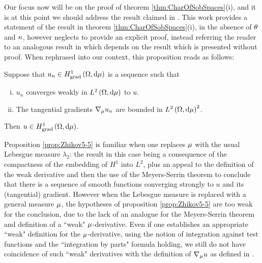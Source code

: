 Our focus now will be on the proof of theorem \ref{thm:CharOfSobSpaces}(i), and it is at this point we should address the result claimed in \cite{zhikov2002homogenization}.
This work provides a statement of the result in theorem \ref{thm:CharOfSobSpaces}(i), in the absence of $\theta$ and $\kappa$, however neglects to provide an explicit proof, instead referring the reader to an analogous result in \cite[lemma 6.1]{zhikov2002homogenization} which depends on the result \cite[proposition 5.5]{zhikov2002homogenization} which is presented without proof.
When rephrased into our context, this proposition reads as follows:
\begin{prop} \label{prop:Zhikov5-5}
	Suppose that $u_n\in H^1_\mathrm{grad}\left( \Omega, \mathrm{d}\mu \right)$ is a sequence such that
	\begin{enumerate}[(i)]
		\item $u_n$ converges weakly in $L^{2}\left( \Omega,\mathrm{d} \mu \right)$ to $u$.
		\item The tangential gradients $\nabla_{\mu}u_n$ are bounded in $L^{2}\left( \Omega,\mathrm{d} \mu \right)^2$.
	\end{enumerate}
	Then $u\in H^1_\mathrm{grad}\left( \Omega, \mathrm{d}\mu \right)$.
\end{prop}
Proposition \ref{prop:Zhikov5-5} is familiar when one replaces $\mu$ with the usual Lebesgue measure $\lambda_2$: the result in this case being a consequence of the compactness of the embedding of $H^1$ into $L^2$, plus an appeal to the definition of the weak derivative and then the use of the Meyers-Serrin theorem to conclude that there is a sequence of smooth functions converging strongly to $u$ and its (tangential) gradient.
However when the Lebesgue measure is replaced with a general measure $\mu$, the hypotheses of proposition \ref{prop:Zhikov5-5} are too weak for the conclusion, due to the lack of an analogue for the Meyers-Serrin theorem and definition of a ``weak" $\mu$-derivative.
Even if one establishes an appropriate ``weak" definition for the $\mu$-derivative, using the notion of integration against test functions and the ``integration by parts" formula holding, we still do not have coincidence of such ``weak" derivatives with the definition of $\nabla_{\mu}u$ as defined in .

